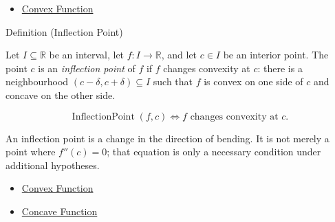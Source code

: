\begin{dependencies}
\begin{itemize}
  \item \hyperref[def:convex-function]{Convex Function}
\end{itemize}
\end{dependencies}

\begin{definitionbox}{Definition (Inflection Point)}
\begin{definition}
\label{def:inflection-point}
Let $I\subseteq\mathbb{R}$ be an interval, let $f:I\to\mathbb{R}$, and let $c\in I$ be an interior point. The point $c$ is an \emph{inflection point} of $f$ if $f$ changes convexity at $c$: there is a neighbourhood $(c-\delta,c+\delta)\subseteq I$ such that $f$ is convex on one side of $c$ and concave on the other side.
\end{definition}
\end{definitionbox}

\begin{remark*}
\[
  \operatorname{InflectionPoint}(f,c)
  \Longleftrightarrow
  f \text{ changes convexity at } c.
\]
\end{remark*}

\begin{remark*}[Interpretation]
An inflection point is a change in the direction of bending. It is not merely a point where $f''(c)=0$; that equation is only a necessary condition under additional hypotheses.
\end{remark*}

\begin{dependencies}
\begin{itemize}
  \item \hyperref[def:convex-function]{Convex Function}
  \item \hyperref[def:concave-function]{Concave Function}
\end{itemize}
\end{dependencies}
